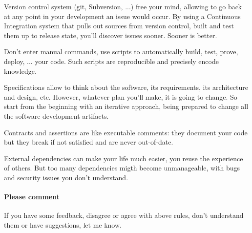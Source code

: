 \documentclass[a4paper]{article}
\newcounter{RuleNumber}
\newcommand{\Rule}{Rule \theRuleNumber:\stepcounter{RuleNumber}}
\begin{document}
\begin{description}
  Version control system (git, Subversion, ...) free your mind, allowing
  to go back at any point in your development an issue would occur. By
  using a Continuous Integration system that pulls out sources from
  version control, built and test them up to release state, you'll
  discover issues sooner. Sooner is better.

\item[\Rule{} Automate everything]

  Don't enter manual commands, use scripts to automatically build, test,
  prove, deploy, ... your code. Such scripts are reproducible and
  precisely encode knowledge.

\item[\Rule{} Specify but use iterative development]

  Specifications allow to think about the software, its requirements,
  its architecture and design, etc. However, whatever plan you'll make,
  it is going to change. So start from the beginning with an iterative
  approach, being prepared to change all the software development
  artifacts.

\item[\Rule{} Use contracts and assertions]

  Contracts and assertions are like executable comments: they document
  your code but they break if not satisfied and are never out-of-date.

\item[\Rule{} Use minimal dependencies but don't reinvent the wheel]

  External dependencies can make your life much easier, you reuse the
  experience of others. But too many dependencies migth become
  unmanageable, with bugs and security issues you don't understand.

\end{description}

\paragraph{Please comment} If you have some feedback, disagree or agree
with above rules, don't understand them or have suggestions, let me
know.
\end{document}
